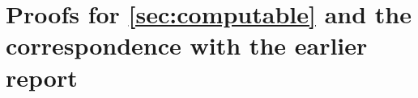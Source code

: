 \section{Proofs for \texorpdfstring{\cref{sec:computable}}{Section \ref*{sec:computable}} and the correspondence with the earlier report}\label{app:related}

